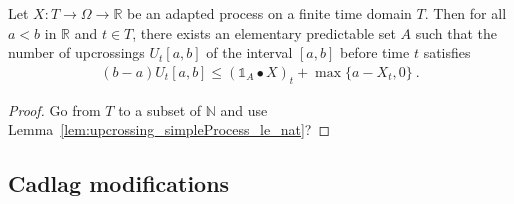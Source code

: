 \begin{lemma}\label{lem:upcrossing_simpleProcess_le}
Let $X : T \to \Omega \to \mathbb{R}$ be an adapted process on a finite time domain $T$.
Then for all $a < b$ in $\mathbb{R}$ and $t \in T$, there exists an elementary predictable set $A$ such that the number of upcrossings $U_t[a, b]$ of the interval $[a, b]$ before time $t$ satisfies
\begin{align*}
  (b - a) U_t[a, b] \le (\mathbb{1}_A \bullet X)_t + \max\{a - X_t, 0\}
  \:.
\end{align*}
\end{lemma}

\begin{proof}
Go from $T$ to a subset of $\mathbb{N}$ and use Lemma~\ref{lem:upcrossing_simpleProcess_le_nat}?


\end{proof}



\subsection{Cadlag modifications}



